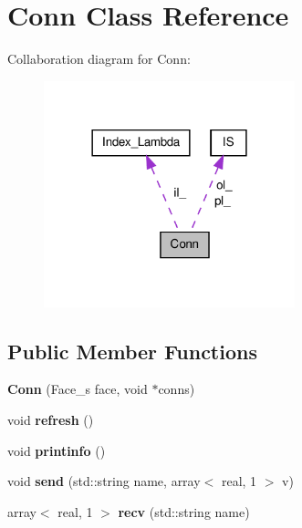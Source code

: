 \hypertarget{classConn}{\section{Conn Class Reference}
\label{classConn}
}


Collaboration diagram for Conn\-:\nopagebreak
\begin{figure}[H]
\begin{center}
\leavevmode
\includegraphics[width=206pt]{classConn__coll__graph}
\end{center}
\end{figure}
\subsection*{Public Member Functions}
\begin{DoxyCompactItemize}
\item 
\hypertarget{classConn_ab0ba4fbd67bc99991f2110c3ca80ca3d}{{\bfseries Conn} (Face\-\_\-s face, void $\ast$conns)}\label{classConn_ab0ba4fbd67bc99991f2110c3ca80ca3d}

\item 
\hypertarget{classConn_af3776731e374e856bb5eac3faea03ae3}{void {\bfseries refresh} ()}\label{classConn_af3776731e374e856bb5eac3faea03ae3}

\item 
\hypertarget{classConn_add96cc92a7575634f44220cb6e2e2421}{void {\bfseries printinfo} ()}\label{classConn_add96cc92a7575634f44220cb6e2e2421}

\item 
\hypertarget{classConn_ace36b6085ceadcfa9654b5950e7719c0}{void {\bfseries send} (std\-::string name, array$<$ real, 1 $>$ v)}\label{classConn_ace36b6085ceadcfa9654b5950e7719c0}

\item 
\hypertarget{classConn_a5f149a3217d7cf6227b48571638cadf8}{array$<$ real, 1 $>$ {\bfseries recv} (std\-::string name)}\label{classConn_a5f149a3217d7cf6227b48571638cadf8}

\end{DoxyCompactItemize}
